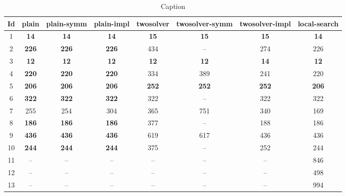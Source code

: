 \begin{table}[h]
	\centering
	\caption{Caption}
	\begin{tabular}{cccccccc}
		\toprule
		Id & plain & plain-symm & plain-impl & twosolver & twosolver-symm & twosolver-impl & local-search \\ 
		\midrule
		1 & \textbf{14} & 	\textbf{14} & 	\textbf{14} & 	\textbf{15} & 	\textbf{15} & 	\textbf{15} & 	\textbf{14} \\ 
		2 & \textbf{226} & 	\textbf{226} & 	\textbf{226} & 	434 & 	-- & 	274 & 	226 \\ 
		3 & \textbf{12} & 	\textbf{12} & 	\textbf{12} & 	\textbf{12} & 	\textbf{12} & 	\textbf{14} & 	\textbf{12} \\ 
		4 & \textbf{220} & 	\textbf{220} & 	\textbf{220} & 	334 & 	389 & 	241 & 	220 \\ 
		5 & \textbf{206} & 	\textbf{206} & 	\textbf{206} & 	\textbf{252} & 	\textbf{252} & 	\textbf{252} & 	\textbf{206} \\ 
		6 & \textbf{322} & 	\textbf{322} & 	\textbf{322} & 	322 & 	-- & 	322 & 	322 \\ 
		7 & 255 & 	254 & 	304 & 	365 & 	751 & 	340 & 	169 \\ 
		8 & \textbf{186} & 	\textbf{186} & 	\textbf{186} & 	377 & 	-- & 	188 & 	186 \\ 
		9 & \textbf{436} & 	\textbf{436} & 	\textbf{436} & 	619 & 	617 & 	436 & 	436 \\ 
		10 & \textbf{244} & 	\textbf{244} & 	\textbf{244} & 	375 & 	-- & 	252 & 	244 \\ 
		11 & -- & 	-- & 	-- & 	-- & 	-- & 	-- & 	846 \\ 
		12 & -- & 	-- & 	-- & 	-- & 	-- & 	-- & 	498 \\ 
		13 & -- & 	-- & 	-- & 	-- & 	-- & 	-- & 	994 \\ 
		\bottomrule
	\end{tabular}
\end{table}